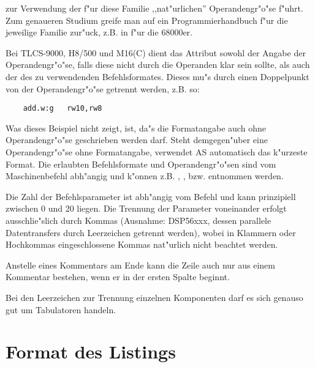 \documentclass[12pt,a4paper,twoside]{report}
\begin{document}
zur Verwendung der f"ur diese Familie ,,nat"urlichen'' Operandengr"o"se
f"uhrt.  Zum genaueren Studium greife man auf ein Programmierhandbuch f"ur
die jeweilige Familie zur"uck, z.B. in \cite{Williams} f"ur die 68000er.
\par
Bei TLCS-9000, H8/500 und M16(C) dient das Attribut sowohl der Angabe der
Operandengr"o"se, falls diese nicht durch die Operanden klar sein sollte,
als auch der des zu verwendenden Befehlsformates.
Dieses mu"s durch einen Doppelpunkt von der Operandengr"o"se getrennt werden,
z.B. so:
\begin{verbatim}
    add.w:g   rw10,rw8
\end{verbatim}
Was dieses Beispiel nicht zeigt, ist, da"s die Formatangabe auch ohne
Operandengr"o"se geschrieben werden darf.  Steht demgegen"uber eine
Operandengr"o"se ohne Formatangabe, verwendet AS automatisch das
k"urzeste Format.  Die erlaubten Befehlsformate und Operandengr"o"sen
sind vom Maschinenbefehl abh"angig und k"onnen z.B. \cite{Tosh9000},
\cite{HitH8_5}, \cite{MitM16} bzw. \cite{MitM16C} entnommen werden.
\par
Die Zahl der Befehlsparameter ist abh"angig vom Befehl und kann
prinzipiell zwischen 0 und 20 liegen.  Die Trennung der Parameter
voneinander erfolgt ausschlie"slich durch Kommas (Ausnahme: DSP56xxx,
dessen parallele Datentransfers durch Leerzeichen getrennt werden),
wobei in Klammern oder Hochkommas eingeschlossene Kommas nat"urlich
nicht beachtet werden.
\par
Anstelle eines Kommentars am Ende kann die Zeile auch nur aus einem
Kommentar bestehen, wenn er in der ersten Spalte beginnt.
\par
Bei den Leerzeichen zur Trennung einzelnen Komponenten darf es sich
genauso gut um Tabulatoren handeln.


\section{Format des Listings}
\end{document}
